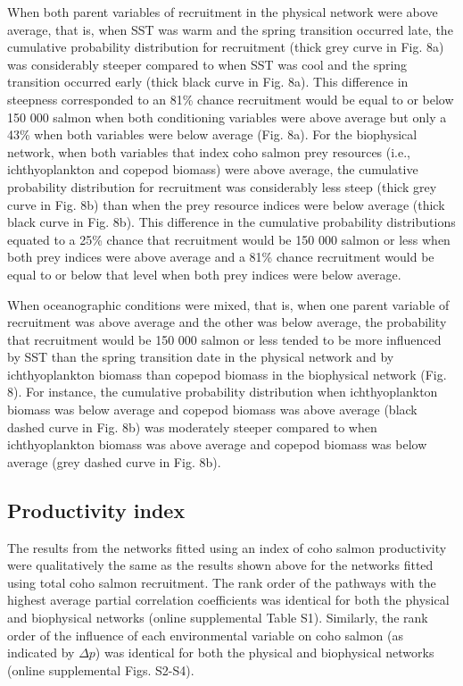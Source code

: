 When both parent variables of recruitment in the physical network were above
average, that is, when SST was warm and the spring transition occurred late, the
cumulative probability distribution for recruitment (thick grey curve in Fig.
8a) was considerably steeper compared to when SST was cool and the spring
transition occurred early (thick black curve in Fig. 8a). This difference in
steepness corresponded to an 81\% chance recruitment would be equal to or below
150 000 salmon when both conditioning variables were above average but only a
43\% when both variables were below average (Fig. 8a). For the biophysical
network, when both variables that index coho salmon prey resources (i.e.,
ichthyoplankton and copepod biomass) were above average, the cumulative
probability distribution for recruitment was considerably less steep (thick grey
curve in Fig. 8b) than when the prey resource indices were below average (thick
black curve in Fig. 8b). This difference in the cumulative probability
distributions equated to a 25\% chance that recruitment would be 150 000 salmon
or less when both prey indices were above average and a 81\% chance recruitment
would be equal to or below that level when both prey indices were below average.

When oceanographic conditions were mixed, that is, when one parent variable of
recruitment was above average and the other was below average, the probability
that recruitment would be 150 000 salmon or less tended to be more influenced by
SST than the spring transition date in the physical network and by
ichthyoplankton biomass than copepod biomass in the biophysical network (Fig.
8). For instance, the cumulative probability distribution when ichthyoplankton
biomass was below average and copepod biomass was above average (black dashed
curve in Fig. 8b) was moderately steeper compared to when ichthyoplankton
biomass was above average and copepod biomass was below average (grey dashed
curve in Fig. 8b).


\subsection{Productivity index}

The results from the networks fitted using an index of coho salmon productivity
were qualitatively the same as the results shown above for the networks fitted
using total coho salmon recruitment. The rank order of the pathways with the
highest average partial correlation coefficients was identical for both the
physical and biophysical networks (online supplemental Table S1). Similarly, the
rank order of the influence of each environmental variable on coho salmon (as
indicated by \(\Delta p\)) was identical for both the physical and biophysical
networks (online supplemental Figs. S2-S4).



